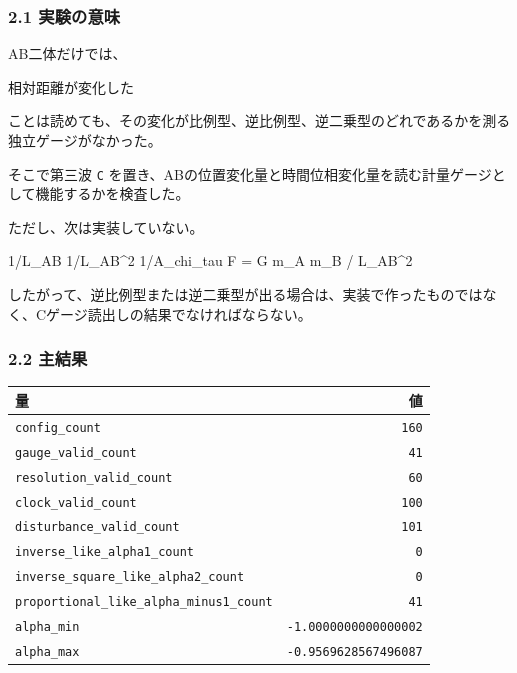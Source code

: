 \documentclass[
]{article}
\newenvironment{Shaded}{}{}
\newcommand{\NormalTok}[1]{#1}
\newcounter{none} %
\begin{document}
\subsubsection{2.1 実験の意味}\label{ux5b9fux9a13ux306eux610fux5473}

AB二体だけでは、

\begin{Shaded}
\begin{Highlighting}[]
\NormalTok{相対距離が変化した}
\end{Highlighting}
\end{Shaded}

ことは読めても、その変化が比例型、逆比例型、逆二乗型のどれであるかを測る独立ゲージがなかった。

そこで第三波 \texttt{C}
を置き、ABの位置変化量と時間位相変化量を読む計量ゲージとして機能するかを検査した。

ただし、次は実装していない。

\begin{Shaded}
\begin{Highlighting}[]
\NormalTok{1/L\_AB}
\NormalTok{1/L\_AB\^{}2}
\NormalTok{1/A\_chi\_tau}
\NormalTok{F = G m\_A m\_B / L\_AB\^{}2}
\end{Highlighting}
\end{Shaded}

したがって、逆比例型または逆二乗型が出る場合は、実装で作ったものではなく、Cゲージ読出しの結果でなければならない。

\subsubsection{2.2 主結果}\label{ux4e3bux7d50ux679c}

{\def\LTcaptype{none} %
\begin{longtable}[]{@{}lr@{}}
\toprule\noalign{}
量 & 値 \\
\midrule\noalign{}
\endhead
\bottomrule\noalign{}
\endlastfoot
\texttt{config\_count} & \texttt{160} \\
\texttt{gauge\_valid\_count} & \texttt{41} \\
\texttt{resolution\_valid\_count} & \texttt{60} \\
\texttt{clock\_valid\_count} & \texttt{100} \\
\texttt{disturbance\_valid\_count} & \texttt{101} \\
\texttt{inverse\_like\_alpha1\_count} & \texttt{0} \\
\texttt{inverse\_square\_like\_alpha2\_count} & \texttt{0} \\
\texttt{proportional\_like\_alpha\_minus1\_count} & \texttt{41} \\
\texttt{alpha\_min} & \texttt{-1.0000000000000002} \\
\texttt{alpha\_max} & \texttt{-0.9569628567496087} \\
\end{longtable}
}
\end{document}
